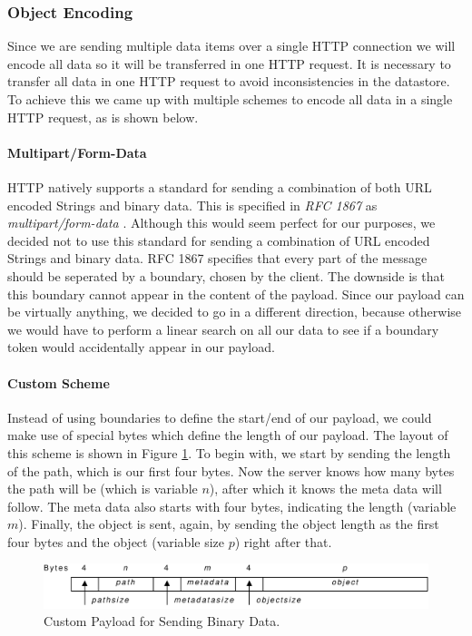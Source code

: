 \subsubsection{Object Encoding} 
\label{serverdesign-encoding}
Since we are sending multiple data items over a single HTTP connection we will
encode all data so it will be transferred in one HTTP request. It is necessary
to transfer all data in one HTTP request to avoid inconsistencies in the
datastore. To achieve this we came up with multiple schemes to encode all data
in a single HTTP request, as is shown below.

\paragraph{Multipart/Form-Data}
HTTP natively supports a standard for sending a combination of both URL encoded
Strings and binary data. This is specified in \emph{RFC 1867} as
\emph{multipart/form-data} \cite{rfc-1867}. Although this would seem perfect for
our purposes, we decided not to use this standard for sending a combination of
URL encoded Strings and binary data. RFC 1867 specifies that every part of the
message should be seperated by a boundary, chosen by the client. The downside is
that this boundary cannot appear in the content of the payload. Since our payload
can be virtually anything, we decided to go in a different direction, because
otherwise we would have to perform a linear search on all our data to see if a
boundary token would accidentally appear in our payload.

\paragraph{Custom Scheme}
Instead of using boundaries to define the start/end of our payload, we could make
use of special bytes which define the length of our payload. The layout of this
scheme is shown in Figure \ref{serverdesign-custom}. To begin with, we start by
sending the length of the path, which is our first four bytes. Now the server
knows how many bytes the path will be (which is variable $n$), after which it
knows the meta data will follow. The meta data also starts with four bytes, indicating
the length (variable $m$). Finally, the object is sent, again, by sending the
object length as the first four bytes and the object (variable size $p$) right
after that.

\begin{figure}[ht] %
\begin{center}
\includegraphics[width=12cm]{./figures/custom_payload.pdf} 
\caption{Custom Payload for Sending Binary Data.\label{serverdesign-custom}}
\end{center}
\end{figure}

